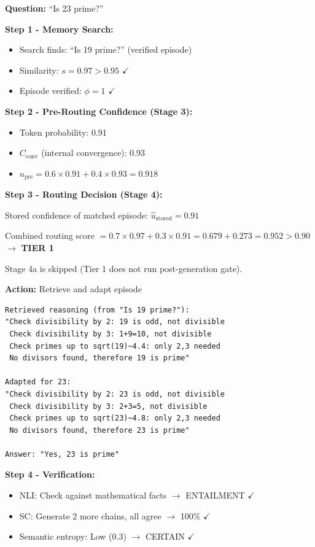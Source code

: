 \documentclass[12pt,a4paper]{article}
\theoremstyle{definition}
\newcommand{\upre}{u_{\text{pre}}}
\newcommand{\ustored}{\hat{u}_{\text{stored}}}
\newcommand{\Cconv}{C_{\text{conv}}}
\begin{document}
\begin{examplebox}[title=Tier 1: Exact Match Retrieval]

\textbf{Question:} ``Is 23 prime?''

\textbf{Step 1 - Memory Search:}
\begin{itemize}
    \item Search finds: ``Is 19 prime?'' (verified episode)
    \item Similarity: $s = 0.97 > 0.95$ $\checkmark$
    \item Episode verified: $\phi = 1$ $\checkmark$
\end{itemize}

\textbf{Step 2 - Pre-Routing Confidence (Stage 3):}
\begin{itemize}
    \item Token probability: 0.91
    \item $\Cconv$ (internal convergence): 0.93
    \item $\upre = 0.6 \times 0.91 + 0.4 \times 0.93 = 0.918$
\end{itemize}

\textbf{Step 3 - Routing Decision (Stage 4):}

Stored confidence of matched episode: $\ustored = 0.91$

Combined routing score $= 0.7 \times 0.97 + 0.3 \times 0.91 = 0.679 + 0.273 = 0.952 > 0.90$ $\rightarrow$ \textbf{TIER 1}

Stage 4a is skipped (Tier 1 does not run post-generation gate).

\textbf{Action:} Retrieve and adapt episode

\begin{verbatim}
Retrieved reasoning (from "Is 19 prime?"):
"Check divisibility by 2: 19 is odd, not divisible
 Check divisibility by 3: 1+9=10, not divisible
 Check primes up to sqrt(19)~4.4: only 2,3 needed
 No divisors found, therefore 19 is prime"

Adapted for 23:
"Check divisibility by 2: 23 is odd, not divisible
 Check divisibility by 3: 2+3=5, not divisible
 Check primes up to sqrt(23)~4.8: only 2,3 needed
 No divisors found, therefore 23 is prime"

Answer: "Yes, 23 is prime"
\end{verbatim}

\textbf{Step 4 - Verification:}
\begin{itemize}
    \item NLI: Check against mathematical facts $\rightarrow$ ENTAILMENT $\checkmark$
    \item SC: Generate 2 more chains, all agree $\rightarrow$ 100\% $\checkmark$
    \item Semantic entropy: Low (0.3) $\rightarrow$ CERTAIN $\checkmark$
\end{itemize}


\end{examplebox}
\end{document}
